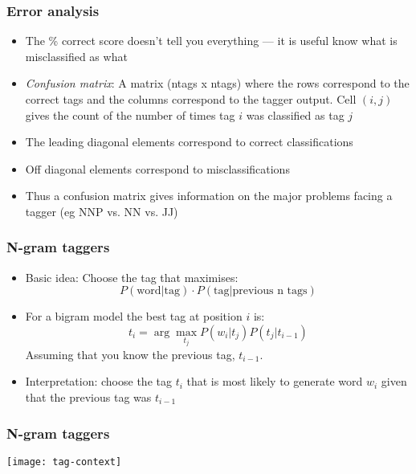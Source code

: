 \begin{frame}[fragile]\frametitle{Error analysis}
  \begin{itemize}
  \item The \% correct score doesn't tell you everything --- it is
    useful know what is misclassified as what
  \item \emph{Confusion matrix}: A matrix (ntags x ntags) where the rows
    correspond to the correct tags and the columns correspond to the
    tagger output.  Cell $(i,j)$ gives the count of the number of
    times tag $i$ was classified as tag $j$
  \item The leading diagonal elements correspond to correct
    classifications
  \item Off diagonal elements correspond to misclassifications 
  \item Thus a confusion matrix gives information on the major
    problems facing a tagger (eg NNP vs. NN vs. JJ)
  \end{itemize}
\end{frame}


\begin{frame}[fragile]\frametitle{N-gram taggers}
  \begin{itemize}
  \item Basic idea:  Choose the tag  that maximises:
    \[ P(\mbox{word} | \mbox{tag}) \cdot 
       P(\mbox{tag} | \mbox{previous n tags}) \]
       
  \item For a bigram model the best tag at position $i$ is:
    \[ t_i = \arg\max_{t_j} P(w_i|t_j) P(t_j | t_{i-1}) \]
    Assuming that you know the previous tag, $t_{i-1}$.
  \item Interpretation: choose the tag $t_i$ that is most likely to
    \alert{generate} word $w_i$ given that the previous tag was $t_{i-1}$ 
  \end{itemize}
\end{frame}

\begin{frame}[fragile]\frametitle{N-gram taggers}
\begin{center}
\texttt{[image: tag-context]}
\end{center}
\end{frame}


